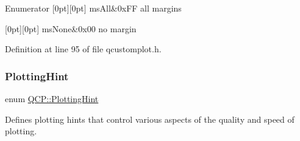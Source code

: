 \begin{DoxyEnumFields}{Enumerator}
[0pt][0pt]{}\mbox{\label{namespace_q_c_p_a7e487e3e2ccb62ab7771065bab7cae54a43d7361cb0c5244eabdc962021bffebc}} 
ms\+All&{\ttfamily 0x\+FF} all margins \\
\hline

[0pt][0pt]{}\mbox{\label{namespace_q_c_p_a7e487e3e2ccb62ab7771065bab7cae54a80aa4149f16dabd538f8b2e3d42c42d5}} 
ms\+None&{\ttfamily 0x00} no margin \\
\hline

\end{DoxyEnumFields}


Definition at line 95 of file qcustomplot.\+h.

\mbox{\label{namespace_q_c_p_a5400e5fcb9528d92002ddb938c1f4ef4}} 
\subsubsection{\texorpdfstring{Plotting\+Hint}{PlottingHint}}
{\footnotesize\ttfamily enum \hyperlink{namespace_q_c_p_a5400e5fcb9528d92002ddb938c1f4ef4}{Q\+C\+P\+::\+Plotting\+Hint}}

Defines plotting hints that control various aspects of the quality and speed of plotting.

